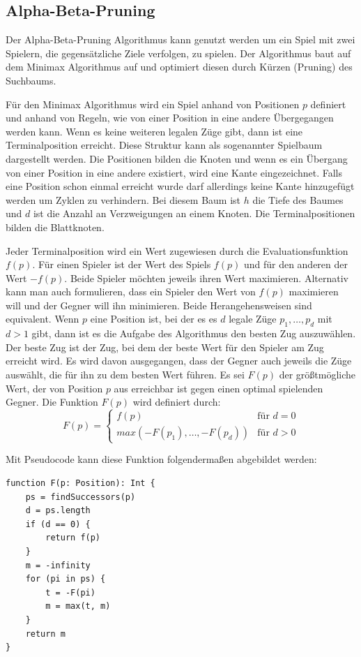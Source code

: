 \subsection{Alpha-Beta-Pruning}
Der Alpha-Beta-Pruning Algorithmus kann genutzt werden um ein Spiel mit zwei Spielern, die gegensätzliche Ziele verfolgen, zu spielen. Der Algorithmus baut auf dem Minimax Algorithmus auf und optimiert diesen durch Kürzen (Pruning) des Suchbaums.

Für den Minimax Algorithmus wird ein Spiel anhand von Positionen $p$ definiert und anhand von Regeln, wie von einer Position in eine andere Übergegangen werden kann. Wenn es keine weiteren legalen Züge gibt, dann ist eine Terminalposition erreicht. Diese Struktur kann als sogenannter Spielbaum dargestellt werden. Die Positionen bilden die Knoten und wenn es ein Übergang von einer Position in eine andere existiert, wird eine Kante eingezeichnet. Falls eine Position schon einmal erreicht wurde darf allerdings keine Kante hinzugefügt werden um Zyklen zu verhindern. Bei diesem Baum ist $h$ die Tiefe des Baumes und $d$ ist die Anzahl an Verzweigungen an einem Knoten. Die Terminalpositionen bilden die Blattknoten.
\cite{knuth_analysis_1975}

Jeder Terminalposition wird ein Wert zugewiesen durch die Evaluationsfunktion $f(p)$. Für einen Spieler ist der Wert des Spiels $f(p)$ und für den anderen der Wert $-f(p)$. Beide Spieler möchten jeweils ihren Wert maximieren. Alternativ kann man auch formulieren, dass ein Spieler den Wert von $f(p)$ maximieren will und der Gegner will ihn minimieren.
Beide Herangehensweisen sind equivalent. Wenn $p$ eine Position ist, bei der es es $d$ legale Züge $p_1,\ldots,p_d$ mit $d > 1$ gibt, dann ist es die Aufgabe des Algorithmus den besten Zug auszuwählen. Der beste Zug ist der Zug, bei dem der beste Wert für den Spieler am Zug erreicht wird. Es wird davon ausgegangen, dass der Gegner auch jeweils die Züge auswählt, die für ihn zu dem besten Wert führen. Es sei $F(p)$ der größtmögliche Wert, der von Position $p$ aus erreichbar ist gegen einen optimal spielenden Gegner. Die Funktion $F(p)$ wird definiert durch:
\begin{equation}
    F(p) = 
    \begin{cases}
        f(p) & \text{für } d = 0 \\
        max(-F(p_1),\ldots,-F(p_d)) & \text{für } d > 0
    \end{cases}
\end{equation}

Mit Pseudocode kann diese Funktion folgendermaßen abgebildet werden:
\begin{lstlisting}[caption=Minimax-Algorithmus,label=lst:minmax]
function F(p: Position): Int {
    ps = findSuccessors(p)
    d = ps.length
    if (d == 0) {
        return f(p)
    }
    m = -infinity
    for (pi in ps) {
        t = -F(pi)
        m = max(t, m)
    }
    return m
}
\end{lstlisting}

